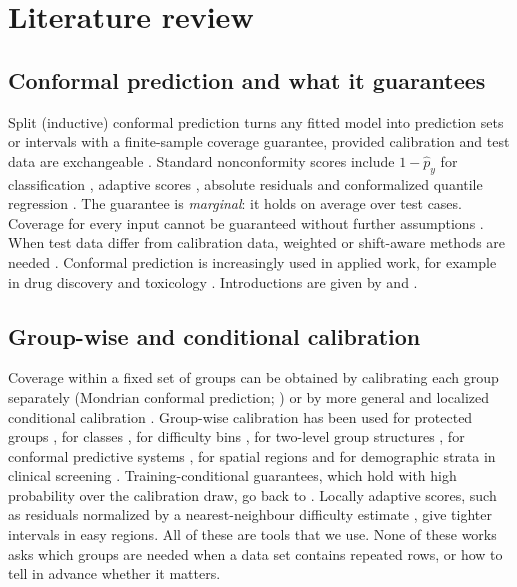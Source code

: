 \section{Literature review}\label{sec:literature}

\subsection{Conformal prediction and what it guarantees}
Split (inductive) conformal prediction turns any fitted model into prediction sets or intervals with a finite-sample coverage guarantee, provided calibration and test data are exchangeable \citep{papadopoulos2002,lei2018,vovk2022}. Standard nonconformity scores include $1-\hat p_y$ for classification \citep{sadinle2019}, adaptive scores \citep{romano2020a}, absolute residuals and conformalized quantile regression \citep{romano2019}. The guarantee is \emph{marginal}: it holds on average over test cases. Coverage for every input cannot be guaranteed without further assumptions \citep{vovk2012,foygelbarber2021}. When test data differ from calibration data, weighted or shift-aware methods are needed \citep{tibshirani2019,barber2023}. Conformal prediction is increasingly used in applied work, for example in drug discovery and toxicology \citep{norinder2014,morger2021,hernandez2026}. Introductions are given by \citet{angelopoulos2023} and \citet{vovk2022}.

\subsection{Group-wise and conditional calibration}
Coverage within a fixed set of groups can be obtained by calibrating each group separately (Mondrian conformal prediction; \citealp{vovk2022}) or by more general and localized conditional calibration \citep{guan2023,gibbs2025,bastani2022}. Group-wise calibration has been used for protected groups \citep{romano2020b}, for classes \citep{lofstrom2015,ding2023}, for difficulty bins \citep{bostrom2020}, for two-level group structures \citep{dunn2023}, for conformal predictive systems \citep{zhang2026}, for spatial regions \citep{seo2026} and for demographic strata in clinical screening \citep{tareaf2026}. Training-conditional guarantees, which hold with high probability over the calibration draw, go back to \citet{vovk2012}. Locally adaptive scores, such as residuals normalized by a nearest-neighbour difficulty estimate \citep{papadopoulos2011}, give tighter intervals in easy regions. All of these are tools that we use. None of these works asks which groups are needed when a data set contains repeated rows, or how to tell in advance whether it matters.

